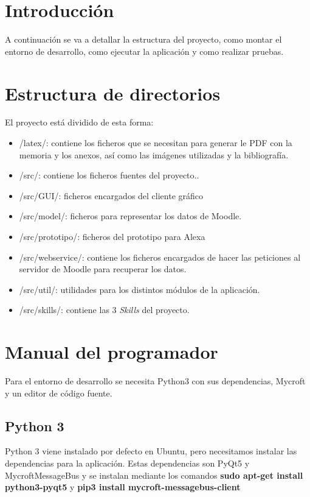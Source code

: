 
\section{Introducción}

A continuación se va a detallar la estructura del proyecto, como montar el entorno de desarrollo, como ejecutar la aplicación y como realizar pruebas.

\section{Estructura de directorios}

El proyecto está dividido de esta forma:

\begin{itemize}
	\item /latex/: contiene los ficheros que se necesitan para generar le PDF con la memoria y los anexos, así como las imágenes utilizadas y la bibliografía.
	\item /src/: contiene los ficheros fuentes del proyecto..
	\item /src/GUI/: ficheros encargados del cliente gráfico
	\item /src/model/: ficheros para representar los datos de Moodle.
	\item /src/prototipo/: ficheros del prototipo para Alexa
	\item /src/webservice/: contiene los ficheros encargados de hacer las peticiones al servidor de Moodle para recuperar los datos.
	\item /src/util/: utilidades para los distintos módulos de la aplicación.
	\item /src/skills/: contiene las 3 \textit{Skills} del proyecto.	
\end{itemize}

\section{Manual del programador}

Para el entorno de desarrollo se necesita Python3 con sus dependencias, Mycroft y un editor de código fuente.

\subsection{Python 3}

Python 3 viene instalado por defecto en Ubuntu, pero necesitamos instalar las dependencias para la aplicación. Estas dependencias son PyQt5 y MycroftMessageBus y se instalan mediante los comandos \textbf{sudo apt-get install python3-pyqt5} y \textbf{pip3 install mycroft-messagebus-client}

